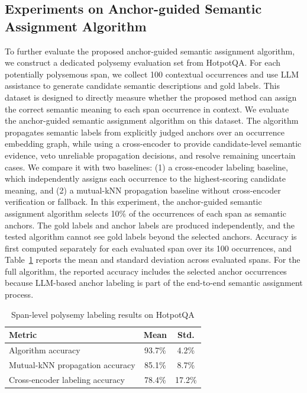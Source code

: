 \documentclass[conference]{IEEEtran}
\begin{document}
\subsection{Experiments on Anchor-guided Semantic Assignment Algorithm}
To further evaluate the proposed anchor-guided semantic assignment algorithm, we construct a dedicated polysemy evaluation set from HotpotQA. For each potentially polysemous span, we collect 100 contextual occurrences and use LLM assistance to generate candidate semantic descriptions and gold labels. This dataset is designed to directly measure whether the proposed method can assign the correct semantic meaning to each span occurrence in context. We evaluate the anchor-guided semantic assignment algorithm on this dataset. The algorithm propagates semantic labels from explicitly judged anchors over an occurrence embedding graph, while using a cross-encoder to provide candidate-level semantic evidence, veto unreliable propagation decisions, and resolve remaining uncertain cases. We compare it with two baselines: (1) a cross-encoder labeling baseline, which independently assigns each occurrence to the highest-scoring candidate meaning, and (2) a mutual-kNN propagation baseline without cross-encoder verification or fallback. In this experiment, the anchor-guided semantic assignment algorithm selects 10\% of the occurrences of each span as semantic anchors. The gold labels and anchor labels are produced independently, and the tested algorithm cannot see gold labels beyond the selected anchors. Accuracy is first computed separately for each evaluated span over its 100 occurrences, and Table~\ref{tab:span_ablation} reports the mean and standard deviation across evaluated spans. For the full algorithm, the reported accuracy includes the selected anchor occurrences because LLM-based anchor labeling is part of the end-to-end semantic assignment process.

\begin{table}[t]
\centering
\small
\setlength{\tabcolsep}{6pt}
\caption{Span-level polysemy labeling results on HotpotQA}
\label{tab:span_ablation}
\begin{tabular}{lcc}
\toprule
Metric & Mean & Std. \\
\midrule
Algorithm accuracy & 93.7\% & 4.2\% \\
Mutual-kNN propagation accuracy & 85.1\% & 8.7\% \\
Cross-encoder labeling accuracy & 78.4\% & 17.2\% \\
\bottomrule
\end{tabular}
\end{table}
\end{document}
